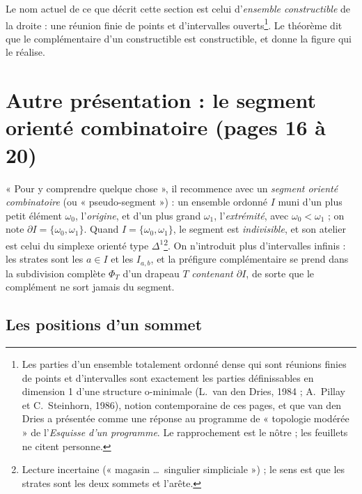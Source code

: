 \documentclass[11pt,a4paper]{article}
\begin{document}
Le nom actuel de ce que décrit cette section est celui d'\emph{ensemble
constructible} de la droite : une réunion finie de points et d'intervalles
ouverts\footnote{Les parties d'un ensemble totalement ordonné dense qui sont
réunions finies de points et d'intervalles sont exactement les parties
définissables en dimension 1 d'une structure o-minimale (L.~van den Dries, 1984 ;
A.~Pillay et C.~Steinhorn, 1986), notion contemporaine de ces pages, et que van
den Dries a présentée comme une réponse au programme de « topologie modérée » de
l'\emph{Esquisse d'un programme}. Le rapprochement est le nôtre ; les feuillets
ne citent personne.}. Le théorème dit que le complémentaire d'un constructible
est constructible, et donne la figure qui le réalise.

\section*{Autre présentation : le segment orienté combinatoire (pages 16 à 20)}

« Pour y comprendre quelque chose », il recommence avec un \emph{segment orienté
combinatoire} (ou « pseudo-segment ») : un ensemble ordonné $I$ muni d'un plus
petit élément $\omega_{0}$, l'\emph{origine}, et d'un plus grand $\omega_{1}$,
l'\emph{extrémité}, avec $\omega_{0} < \omega_{1}$ ; on note $\partial I =
\{\omega_{0}, \omega_{1}\}$. Quand $I = \{\omega_{0}, \omega_{1}\}$, le segment
est \emph{indivisible}, et son atelier est celui du simplexe orienté type
$\Delta^{1}$\footnote{Lecture incertaine (« magasin \ldots\ singulier
simpliciale ») ; le sens est que les strates sont les deux sommets et l'arête.}.
On n'introduit plus d'intervalles infinis : les strates sont les $a \in I$ et
les $I_{a,b}$, et la préfigure complémentaire se prend dans la subdivision
complète $\Phi_{T}$ d'un drapeau $T$ \emph{contenant $\partial I$}, de sorte que
le complément ne sort jamais du segment.

\subsection*{Les positions d'un sommet}
\end{document}
